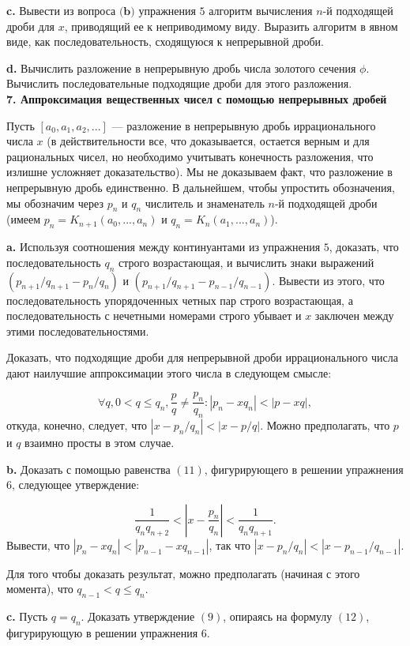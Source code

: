 \documentclass{mai_book}
\begin{document}
\textbf{c.} Вывести из вопроса $\textbf{(b)}$ упражнения $5$ алгоритм вычисления $n$-й подходящей дроби для $x$, приводящий ее к неприводимому виду. Выразить алгоритм в явном виде, как последовательность, сходящуюся к
непрерывной дроби.

\textbf{d.} Вычислить разложение в непрерывную дробь числа золотого 
сечения $\phi$. Вычислить последовательные подходящие дроби для этого 
разложения.
\\

\noindent \textbf{7. Аппроксимация вещественных чисел с помощью
непрерывных дробей}

Пусть $[a_0,a_1,a_2,...]$ — разложение в непрерывную дробь 
иррационального числа $x$ (в действительности все, что доказывается, 
остается верным и для рациональных чисел, но необходимо учитывать 
конечность разложения, что излишне усложняет доказательство). Мы не
доказываем факт, что разложение в непрерывную дробь 
единственно. В дальнейшем, чтобы упростить обозначения, мы обозначим 
через $p_n$ и $q_n$ числитель и знаменатель $n$-й подходящей дроби (имеем
$p_n = K_{n+1}(a_0,...,a_n)$ и $q_n = K_n(a_1,...,a_n)$).

\textbf{a.} Используя соотношения между континуантами из упражнения $5$,
доказать, что последовательность $q_n$ строго возрастающая, и 
вычислить знаки выражений $(p_{n+1}/q_{n+1} - p_n/q_n)$ и $(p_{n+1}/q_{n+1} -p_{n-1}/q_{n-1})$. Вывести из этого, что последовательность упорядоченных четных пар строго возрастающая, а последовательность с нечетными номерами
строго убывает и $x$ заключен между этими последовательностями.

Доказать, что подходящие дроби для непрерывной дроби 
иррационального числа дают наилучшие аппроксимации этого числа в 
следующем смысле:

\[
\forall q, 0<q \le q_n, \frac{p}{q} \ne \frac{p_n}{q_n}: |p_n-xq_n|<|p-xq|,
\]
откуда, конечно, следует, что $|x-p_n/q_n|<|x-p/q|$. Можно 
предполагать, что $p$ и $q$ взаимно просты в этом случае.

\textbf{b.} Доказать с помощью равенства $(11)$, фигурирующего в решении
упражнения $6$, следующее утверждение:

\[
\frac{1}{q_nq_{n+2}}<|x-\frac{p_n}{q_n}|<\frac{1}{q_nq_{n+1}}.
\]
Вывести, что $|p_n-xq_n| < |p_{n-1}-xq_{n-1}|$, так что $|x-p_n/q_n|<|x-p_{n-1}/q_{n-1}|$.

Для того чтобы доказать результат, можно предполагать (начиная
с этого момента), что $q_{n-1} < q \le q_n$.

\textbf{c.} Пусть $q = q_n$. Доказать утверждение $(9)$, опираясь на 
формулу $(12)$, фигурирующую в решении упражнения $6$.
\end{document}
